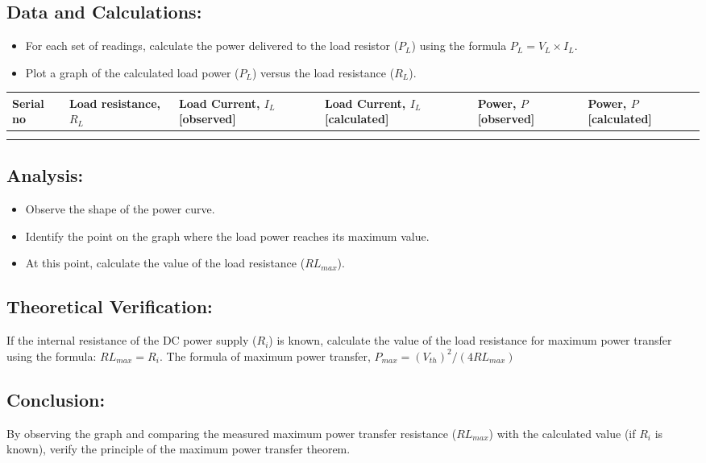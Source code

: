 \subsection*{Data and Calculations:}
\begin{itemize}
    \item For each set of readings, calculate the power delivered to the load resistor ($P_L$) using the formula $P_L = V_L \times I_L$.
    \item Plot a graph of the calculated load power ($P_L$) versus the load resistance ($R_L$).
\end{itemize}

\begin{table}[H]
    \centering
    \begin{tabular}{m{1cm}|m{2cm}|m{2.5cm}|m{2.5cm}|m{2cm}|m{2cm}}
        \hline
        Serial no & Load resistance, $R_L$ & Load Current, $I_L$ [observed] & Load Current, $I_L$ [calculated] & Power, $P$ [observed] & Power, $P$ [calculated] \\
        \hline
          &   &   &   &  & \\
        \hline
          &   &   &   &  & \\
        \hline

    \end{tabular}
    \label{tab:placeholder_label}
\end{table}

\subsection*{Analysis:}
\begin{itemize}
    \item Observe the shape of the power curve.
    \item Identify the point on the graph where the load power reaches its maximum value.
    \item At this point, calculate the value of the load resistance ($RL_{max}$).
\end{itemize}

\subsection*{Theoretical Verification:}
If the internal resistance of the DC power supply ($R_i$) is known, calculate the value of the load resistance for maximum power transfer using the formula: $RL_{max} = R_i$. The formula of maximum power transfer, $P_{max} = (V_{th})^2 / (4 RL_{max})$

\subsection*{Conclusion:}
By observing the graph and comparing the measured maximum power transfer resistance ($RL_{max}$) with the calculated value (if $R_i$ is known), verify the principle of the maximum power transfer theorem.

\newpage

